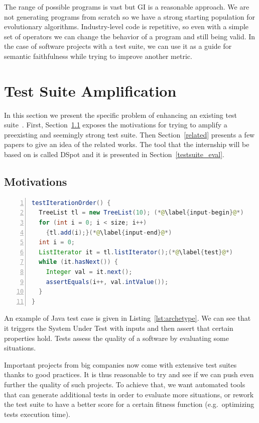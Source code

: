 \documentclass[11pt]{sdm}
\newcommand{\addref}[1]{\colorbox{TealBlue!100}{\textcolor{white}{\textbf{$[$\ifx&#1&\ \else#1\fi$]$}}}}
\newcommand{\dspot}{DSpot\xspace}
\begin{document}
The range of possible programs is vast but GI is a reasonable approach.
We are not generating programs from scratch so we have a strong starting population for evolutionary algorithms.
Industry-level code is repetitive, so even with a simple set of operators we can change the behavior of a program and still being valid.
In the case of software projects with a test suite, we can use it as a guide for semantic faithfulness while trying to improve another metric.


\section{Test Suite Amplification}
\label{tsa}
In this section we present the specific problem of enhancing an existing test suite~\cite{danglot2017emerging}.
First, Section~\ref{motiv_tsa} exposes the motivations for trying to amplify a preexisting and seemingly strong test suite.
Then Section~\ref{related} presents a few papers to give an idea of the related works.
The tool that the internship will be based on is called \dspot{} and it is presented in Section~\ref{testsuite_eval}.


\subsection{Motivations}
\label{motiv_tsa}

\begin{lstlisting}[caption={An archetypal example of an object-oriented test case  (taken from the Apache Commons Collections, in the class TreeListTest, line 270)},label=lst:archetype,float,language=java,numbers=left]
testIterationOrder() {
  TreeList tl = new TreeList(10); (*@\label{input-begin}@*)
  for (int i = 0; i < size; i++)
    {tl.add(i);}(*@\label{input-end}@*)
  int i = 0;
  ListIterator it = tl.listIterator();(*@\label{test}@*)
  while (it.hasNext()) {
    Integer val = it.next();
    assertEquals(i++, val.intValue());
  }
}
\end{lstlisting}

An example of Java test case is given in Listing~\ref{lst:archetype}.
We can see that it triggers the System Under Test with inputs and then assert that certain properties hold.
Tests assess the quality of a software by evaluating some situations.

Important projects from big companies now come with extensive test suites thanks to good practices.
It is thus reasonable to try and see if we can push even further the quality of such projects.
To achieve that, we want automated tools that can generate additional tests in order to evaluate more situations, or rework the test suite to have a better score for a certain fitness function (e.g.\ optimizing tests execution time).
\end{document}
